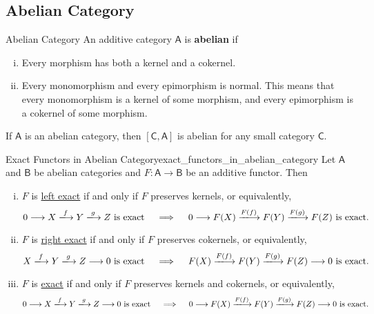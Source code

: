 \subsection{Abelian Category}
\begin{definition}{Abelian Category}{}
    An additive category $\mathsf{A}$ is \textbf{abelian} if 
    \begin{enumerate}[(i)]
        \item Every morphism has both a kernel and a cokernel.
        \item Every monomorphism and every epimorphism is normal. This means that every monomorphism is a kernel of some morphism, and every epimorphism is a cokernel of some morphism.
    \end{enumerate}
\end{definition}


\begin{proposition}{}{}
    If $\mathsf{A}$ is an abelian category, then $\left[\mathsf{C}, \mathsf{A}\right]$ is abelian for any small category $\mathsf{C}$.
\end{proposition}

\begin{proposition}{Exact Functors in Abelian Category}{exact_functors_in_abelian_category}
    Let $\mathsf{A}$ and $\mathsf{B}$ be abelian categories and $F:\mathsf{A}\to\mathsf{B}$ be an additive functor. Then
    \begin{enumerate}[(i)]
        \item $F$ is \hyperref[th:exact_functor]{left exact} if and only if $F$ preserves kernels, or equivalently,
        \[
        0\longrightarrow X\xlongrightarrow{f} Y\xlongrightarrow{g} Z\text{ is exact}\quad\implies\quad 0\longrightarrow F(X)\xlongrightarrow{F(f)} F(Y)\xlongrightarrow{F(g)} F(Z)\text{ is exact}.    
        \]
        \item $F$ is \hyperref[th:exact_functor]{right exact} if and only if $F$ preserves cokernels, or equivalently,
        \[
        X\xlongrightarrow{f} Y\xlongrightarrow{g} Z\longrightarrow 0\text{ is exact}\quad\implies\quad F(X)\xlongrightarrow{F(f)} F(Y)\xlongrightarrow{F(g)} F(Z)\longrightarrow 0\text{ is exact}.
        \]
        \item $F$ is \hyperref[th:exact_functor]{exact} if and only if $F$ preserves kernels and cokernels, or equivalently,
        \[
        0\longrightarrow X\xlongrightarrow{f} Y\xlongrightarrow{g} Z\longrightarrow 0\text{ is exact}\quad\implies\quad 0\longrightarrow F(X)\xlongrightarrow{F(f)} F(Y)\xlongrightarrow{F(g)} F(Z)\longrightarrow 0\text{ is exact}.
        \]
    \end{enumerate}

\end{proposition}


